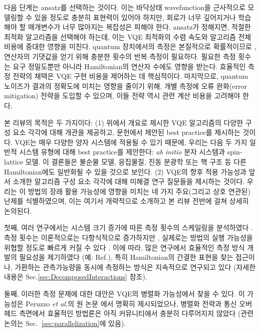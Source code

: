 다음 단계는 ansatz를 선택하는 것이다. 이는 바닥상태 wavefunction을 근사적으로 모델링할 수 있을 정도로 충분히 표현력이 있어야 하지만, 회로가 너무 깊어지거나 학습해야 할 매개변수가 너무 많아지는 복잡성은 피해야 한다. ansatz가 정해지면, 적절한 최적화 알고리즘을 선택해야 하는데, 이는 VQE 최적화의 수렴 속도와 알고리즘 전체 비용에 중대한 영향을 미친다. quantum 장치에서의 측정은 본질적으로 확률적이므로 \cite{nielsenQuantumComputationQuantum2010}, 연산자의 기댓값을 얻기 위해 충분한 횟수의 반복 측정이 필요하다. 필요한 측정 횟수는 요구 정밀도뿐만 아니라 Hamiltonian의 연산자 수에도 영향을 받는다. 효율적인 측정 전략의 채택은 VQE 구현 비용을 제어하는 데 핵심적이다. 마지막으로, quantum 노이즈가 결과의 정확도에 미치는 영향을 줄이기 위해, 개별 측정에 오류 완화(error mitigation) 전략을 도입할 수 있으며, 이들 전략 역시 관련 계산 비용을 고려해야 한다.

본 리뷰의 목적은 두 가지이다: (1) 위에서 개요로 제시한 VQE 알고리즘의 다양한 구성 요소 각각에 대해 개관을 제공하고, 문헌에서 제안된 best practice를 제시하는 것이다. VQE는 매우 다양한 양자 시스템에 적용될 수 있기 때문에, 우리는 다음 두 가지 일반적 시스템 유형에 대해 best practice를 제안한다: \textit{ab initio} 분자 시스템과 spin-lattice 모델. 이 결론들은 불순물 모델, 응집물질, 진동 분광학 또는 핵 구조 등 다른 Hamiltonian에도 일반화될 수 있을 것으로 보인다. (2) VQE의 향후 적용 가능성과 앞서 소개한 알고리즘 구성 요소 각각에 대해 미해결 연구 질문들을 제시하는 것이다. 우리는 이 방법의 장래 활용 가능성에 영향을 미치는 네 가지 주요(그리고 상호 연관된) 난제를 식별하였으며, 이는 여기서 개략적으로 소개하고 본 리뷰 전반에 걸쳐 상세히 논의된다.

첫째, 여러 연구에서는 시스템 크기 증가에 따른 측정 횟수의 스케일링을 분석하였다 \cite{Wecker2015, Elfving2020, Kuhn2019, Gonthier2020}. 측정 횟수는 이론적으로는 다항식적으로 증가하지만 \cite{mccleanTheoryVariationalHybrid2015}, 실제로는 방법의 실행 가능성을 위협할 정도로 빠르게 커질 수 있다 \cite{Wecker2015, Elfving2020, Gonthier2020}. 이에 따라, 많은 연구에서 효율적인 측정 방식 개발의 필요성을 제기하였다 (예: Ref.\cite{Gonthier2020}), 특히 Hamiltonian의 간결한 표현을 찾는 접근이나, 가환하는 관측가능량을 동시에 측정하는 방식은 지속적으로 연구되고 있다 (자세한 내용은 Sec.\ref{sec:DecomposedInteractions} 참조).

둘째, 이러한 측정 문제에 대한 대안은 VQE의 병렬화 가능성에서 찾을 수 있다. 이 가능성은 Peruzzo {\it et al.}의 원 논문 \cite{Peruzzo2014}에서 명확히 제시되었으나, 병렬화 전략과 통신 오버헤드 측면에서 효율적인 방법론은 아직 커뮤니티에서 충분히 다루어지지 않았다 (관련 논의는 Sec.~\ref{sec:parallelization}에 있음).

